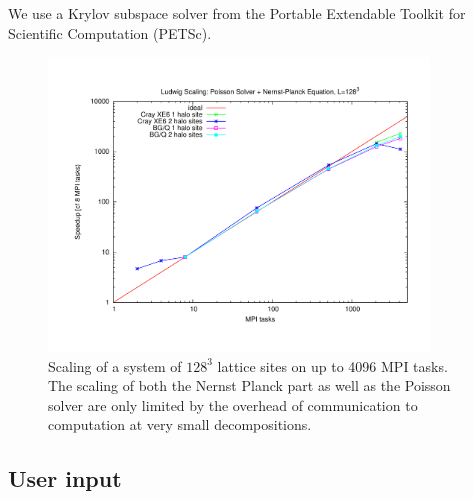 We use a Krylov subspace solver from the Portable Extendable Toolkit for Scientific Computation (PETSc). 

\begin{figure}[htpb]
\includegraphics[width=0.9\textwidth]{./pics/petsc_scaling.pdf}
\caption{Scaling of a system of $128^3$ lattice sites on up to 4096 MPI tasks. 
The scaling of both the Nernst Planck part as well as the Poisson solver are only limited by the overhead of communication to computation at very small decompositions.} 
\label{fig6} 
\end{figure}
\clearpage


\subsection{User input}
